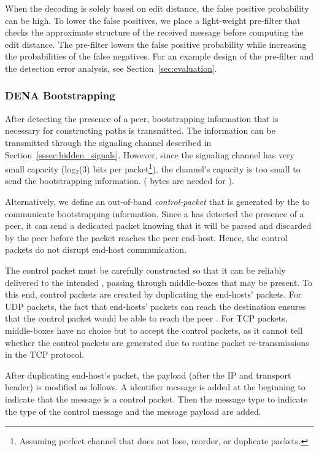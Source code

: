 When the decoding is solely based on edit distance, the false positive
probability can be high. To lower the false positives, we place a light-weight
pre-filter that checks the approximate structure of the received message before
computing the edit distance. The pre-filter lowers the false positive
probability while increasing the probabilities of the false negatives. For an
example design of the pre-filter and the detection error analysis, see
Section~\ref{sec:evaluation}.

\subsubsection{DENA Bootstrapping}
\label{subsubsection:bootstrapping}

After detecting the presence of a peer, bootstrapping information that is
necessary for constructing \scion paths is transmitted. The information can be
transmitted through the signaling channel described in
Section~\ref{sssec:hidden_signals}. However, since the signaling channel has
very small capacity (\ie log$_2$(3) bits per packet\footnote{Assuming perfect
channel that does not lose, reorder, or duplicate packets.}), the channel's
capacity is too small to send the bootstrapping information. ( bytes are
needed for \scion).

Alternatively, we define an out-of-band \textit{control-packet} that is
generated by the \names to communicate bootstrapping information. Since a \name
has detected the presence of a peer, it can send a dedicated packet knowing
that it will be parsed and discarded by the peer \name before the packet
reaches the peer end-host. Hence, the control packets do not disrupt end-host
communication.

The control packet must be carefully constructed so that it can be reliably
delivered to the intended \name, passing through middle-boxes that may be
present. To this end, control packets are created by duplicating the end-hosts'
packets. For UDP packets, the fact that end-hosts' packets can reach the
destination ensures that the control packet would be able to reach the peer
\name. For TCP packets, middle-boxes have no choice but to accept the control
packets, as it cannot tell whether the control packets are generated due to
routine packet re-transmissions in the TCP protocol.

After duplicating end-host's packet, the payload (after the IP and transport
header) is modified as follows. A \name identifier message is added at the
beginning to indicate that the message is a \name control packet. Then the
message type to indicate the type of the control message and the message
payload are added.

